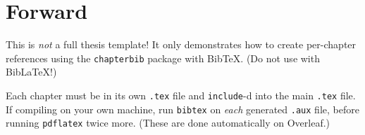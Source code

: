 \chapter*{Forward}
This is \emph{not} a full thesis template! It only demonstrates how to create per-chapter references using the \texttt{chapterbib} package with BibTeX. (Do not use with BibLaTeX!)

Each chapter must be in its own \texttt{.tex} file and \texttt{include}-d into the main \texttt{.tex} file. If compiling on your own machine, run \texttt{bibtex} on \emph{each} generated \texttt{.aux} file, before running \texttt{pdflatex} twice more. (These are done automatically on Overleaf.)
